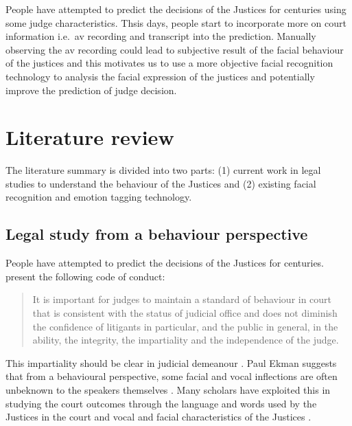 \documentclass{monashthesis}
\begin{document}
People have attempted to predict the decisions of the Justices for centuries using some judge characteristics. Thsis days, people start to incorporate more on court information i.e.~av recording and transcript into the prediction. Manually observing the av recording could lead to subjective result of the facial behaviour of the justices and this motivates us to use a more objective facial recognition technology to analysis the facial expression of the justices and potentially improve the prediction of judge decision.

\hypertarget{literature-review}{%
\section{Literature review}\label{literature-review}}

The literature summary is divided into two parts: (1) current work in legal studies to understand the behaviour of the Justices and (2) existing facial recognition and emotion tagging technology.

\hypertarget{legal-study-from-a-behaviour-perspective}{%
\subsection{Legal study from a behaviour perspective}\label{legal-study-from-a-behaviour-perspective}}

People have attempted to predict the decisions of the Justices for centuries. \textcite{judicalguid} present the following code of conduct:

\begin{quote}
It is important for judges to maintain a standard of behaviour in court that is consistent with the status of judicial office and does not diminish the confidence of litigants in particular, and the public in general, in the ability, the integrity, the impartiality and the independence of the judge.
\end{quote}

This impartiality should be clear in judicial demeanour \autocites{tutton2018judicial}{goffman1956nature}. Paul Ekman \autocite{ekman1991invited} suggests that from a behavioural perspective, some facial and vocal inflections are often unbeknown to the speakers themselves . Many scholars have exploited this in studying the court outcomes through the language and words used by the Justices in the court \autocite{Shullman2004illusion} and vocal and facial characteristics of the Justices \autocite{chen2018justice}.
\end{document}
